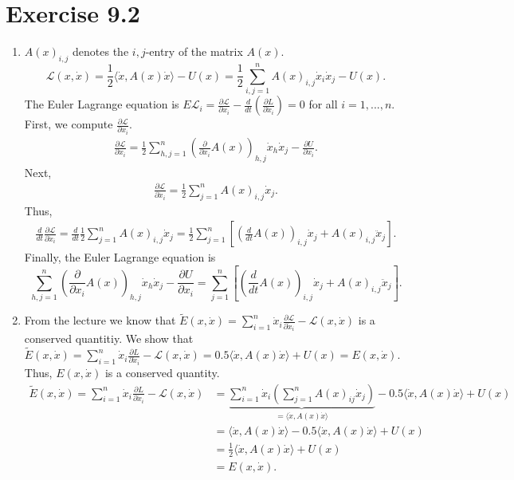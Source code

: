\documentclass[a4paper]{article}
\theoremstyle{plain}
\begin{document}
\section*{Exercise 9.2}
\begin{enumerate}[label=(\alph*)]
	\item $A(x)_{i,j}$ denotes the $i,j$-entry of the matrix $A(x)$. $$\mathcal L(x,\dot x) = \frac{1}{2}\langle \dot x, A(x)\dot x \rangle - U(x) = \frac{1}{2}\sum^n_{i,j = 1}A(x)_{i,j} \dot x_i \dot x_j - U(x).$$
	The Euler Lagrange equation is $E\mathcal L_i = \frac{\partial \mathcal L}{\partial x_i} - \frac{d}{dt}(\frac{\partial L}{\partial \dot x_i}) = 0$ for all $i = 1,...,n$. First, we compute $ \frac{\partial \mathcal L}{\partial x_i}$.
	\begin{align*}
		\frac{\partial \mathcal L}{\partial x_i} = \frac{1}{2} \sum^n_{h,j=1} \left(\frac{\partial}{\partial x_i} A(x)\right)_{h,j} \dot x_h \dot x_j - \frac{\partial U}{\partial x_i}.
	\end{align*}
	Next,
	\begin{align*}
		\frac{\partial \mathcal L}{\partial \dot x_i} = \frac{1}{2} \sum^n_{j=1} A(x)_{i,j} \dot x_j.
	\end{align*}
	Thus,
	\begin{align*}
		\frac{d}{dt}\frac{\partial \mathcal L}{\partial \dot x_i} = \frac{d}{dt}\frac{1}{2} \sum^n_{j=1} A(x)_{i,j} \dot x_j = \frac{1}{2}\sum^n_{j=1}[\left(\frac{d}{dt}A(x)\right)_{i,j} \dot x_j + A(x)_{i,j} \ddot x_j].
	\end{align*}
	Finally, the Euler Lagrange equation is
	\[
		 \sum^n_{h,j=1} \left(\frac{\partial}{\partial x_i} A(x)\right)_{h,j} \dot x_h \dot x_j - \frac{\partial U}{\partial x_i} = \sum^n_{j=1}[\left(\frac{d}{dt}A(x)\right)_{i,j} \dot x_j + A(x)_{i,j} \ddot x_j].
	\]
	
	\item From the lecture we know that $\tilde E(x,\dot x) = \sum^n_{i=1} \dot x_i \frac{\partial \mathcal L}{\partial \dot x_i} - \mathcal L(x,\dot x)$ is a conserved quantitiy. We show that $ \tilde E(x,\dot x) = \sum^n_{i=1} \dot x_i \frac{\partial L}{\partial \dot x_i} - \mathcal L(x,\dot x) = 0.5\langle \dot x, A(x) \dot x \rangle + U(x) = E(x, \dot x)$. Thus, $E(x, \dot x)$ is a conserved quantity.
	\begin{align*}
		\tilde E(x, \dot x) = \sum^n_{i=1} \dot x_i \frac{\partial L}{\partial \dot x_i} - \mathcal L(x,\dot x) &= \underbrace{\sum^n_{i=1}\dot x_i(\sum^n_{j=1}A(x)_{ij} \dot x_j)}_{=\langle \dot x, A(x) \dot x\rangle} - 0.5 \langle \dot x, A(x) \dot x \rangle + U(x) \\
		&= \langle \dot x, A(x) \dot x\rangle- 0.5 \langle \dot x, A(x) \dot x \rangle + U(x) \\
		&= \frac{1}{2} \langle \dot x, A(x) \dot x\rangle + U(x) \\
		&= E(x, \dot x).
	\end{align*}
	

\end{enumerate}
\end{document}
